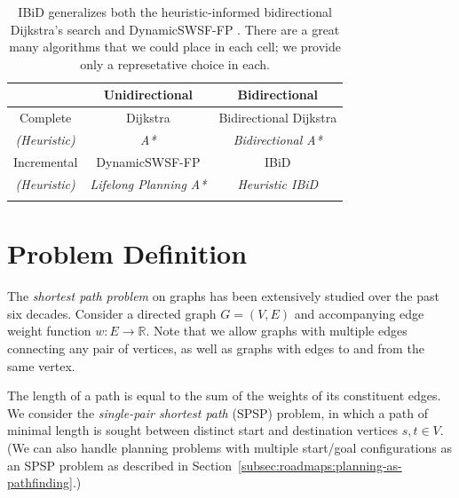 \begin{table}
   \centering
   \begin{tabular}{ccc}
      \toprule
      & Unidirectional & Bidirectional \\
      \midrule
      \addlinespace[0.2em]
      Complete
         & Dijkstra \citep{dijkstra1959anote}
         & Bidirectional Dijkstra \citep{luby1989bidijk} \\
      \addlinespace[-0.2em]
      \emph{(Heuristic)}
         & \emph{A* \citep{hart1968astar}}
         & \emph{Bidirectional A* \citep{ikeda1994betterroutes}} \\
      \addlinespace[0.3em]
      Incremental
         & DynamicSWSF-FP \citep{ramalingam1996dynamicswsffp}
         & {IBiD} \\
      \addlinespace[-0.2em]
      \emph{(Heuristic)}
         & \emph{Lifelong Planning A* \citep{koenig2004lpastar}}
         & \emph{Heuristic IBiD} \\
      \addlinespace[0.2em]
      \bottomrule
   \end{tabular}
   \caption{
      IBiD generalizes both the heuristic-informed
      bidirectional Dijkstra's search \citep{goldberg2005spexternalmemory}
      and DynamicSWSF-FP \citep{ramalingam1996dynamicswsffp}.
      There are a great many algorithms that we could place in each cell;
      we provide only a represetative choice in each.}
   \label{tab:ibid:alg-overview}
\end{table}

\section{Problem Definition}
\label{subsec:ibid-probdef}

The \emph{shortest path problem} on graphs has been extensively
studied over the past six decades.
Consider a directed graph $G = (V,E)$ and accompanying edge weight
function $w : E \rightarrow \mathbb{R}$.
Note that we allow graphs with multiple edges connecting any pair
of vertices,
as well as graphs with edges to and from the same vertex.

The length of a path is equal to the sum of the weights of its
constituent edges.
We consider the \emph{single-pair shortest path} (SPSP) problem,
in which a path of minimal length is sought
between distinct start and destination vertices
$s,t \in V$.
(We can also handle planning problems with multiple
start/goal configurations as an SPSP problem
as described in Section~\ref{subsec:roadmaps:planning-as-pathfinding}.)

